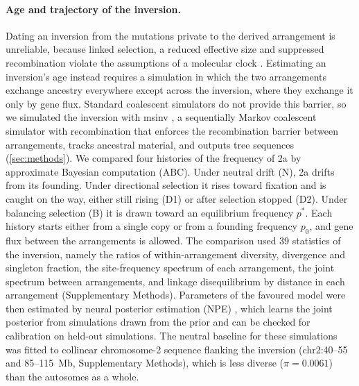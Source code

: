 \documentclass[11pt]{article}
\begin{document}
\paragraph{Age and trajectory of the inversion.}
Dating an inversion from the mutations private to the derived arrangement is unreliable, because linked selection, a reduced effective size and suppressed recombination violate the assumptions of a molecular clock \citep{wellenreuther2025}. Estimating an inversion's age instead requires a simulation in which the two arrangements exchange ancestry everywhere
except across the inversion, where they exchange it only by gene flux. Standard coalescent simulators do not provide
this barrier, so we simulated the inversion with msinv \citep{msinv}, a sequentially Markov coalescent simulator with
recombination that enforces the recombination barrier between arrangements, tracks ancestral material, and outputs
tree sequences (\cref{sec:methods}). We compared four histories of the frequency of 2a by approximate Bayesian
computation (ABC). Under neutral drift (N), 2a drifts
from its founding. Under directional selection it rises toward fixation and is caught on the way, either still rising
(D1) or after selection stopped (D2). Under balancing selection (B) it is drawn toward an equilibrium frequency
$p^{*}$. Each history starts either from a single copy or from a founding frequency $p_0$, and gene flux between the
arrangements is allowed. The comparison used 39 statistics of the inversion, namely the ratios of
within-arrangement diversity, divergence and singleton fraction, the site-frequency spectrum of each arrangement,
the joint spectrum between arrangements, and linkage disequilibrium by distance in each arrangement (Supplementary
Methods). Parameters of the favoured model were then estimated by neural posterior estimation (NPE)
\citep{cranmer2020,min2026}, which learns the joint posterior from simulations drawn from the prior and can be
checked for calibration on held-out simulations. The neutral baseline for these simulations was fitted to collinear chromosome-2 sequence flanking the
inversion (chr2:40--55 and 85--115~Mb, Supplementary Methods), which is less diverse ($\pi=0.0061$) than the
autosomes as a whole.
\end{document}
